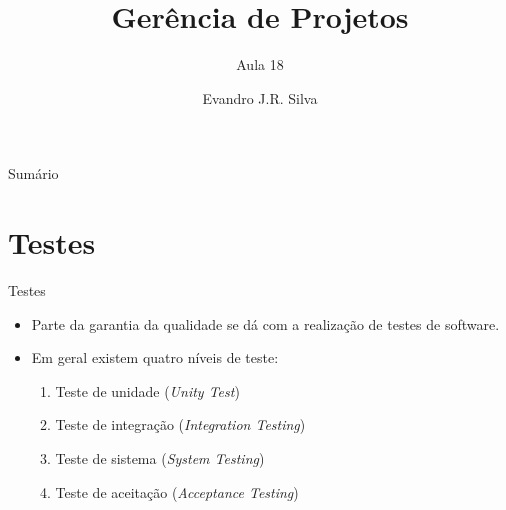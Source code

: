 \documentclass{beamer}
\title[GP 18]{Gerência de Projetos}
\subtitle{Aula 18}
\author[E.J.R. Silva]{Evandro J.R. Silva}
\date{}
\begin{document}
    
\begin{frame}
    \titlepage
\end{frame}

\begin{frame}{Sumário}
    \tableofcontents
\end{frame}

\section{Testes}

\begin{frame}{Testes}
	\begin{itemize}
		\justifying
		\item Parte da garantia da qualidade se dá com a realização de testes de software.
		\item Em geral existem quatro níveis de teste:
			\begin{enumerate}
				\item Teste de unidade (\textit{Unity Test})
				\item Teste de integração (\textit{Integration Testing})
				\item Teste de sistema (\textit{System Testing})
				\item Teste de aceitação (\textit{Acceptance Testing})
			\end{enumerate}
	\end{itemize}
\end{frame}
\end{document}

